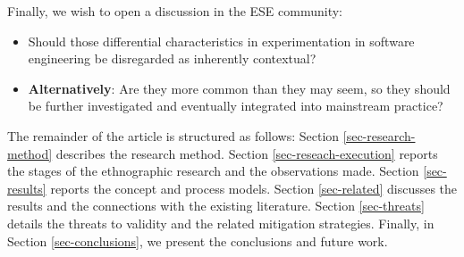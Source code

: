 Finally, we wish to open a discussion in the ESE community: 
\begin{itemize}
  \item Should those differential characteristics in experimentation in software engineering be disregarded as inherently contextual?
  \item  \textbf{Alternatively}: Are they more common than they may seem, so they should be further investigated and eventually integrated into mainstream practice?
\end{itemize}

The remainder of the article is structured as follows: Section \ref{sec-research-method} describes the research method. Section \ref{sec-reseach-execution} reports the stages of the ethnographic research and the observations made. Section \ref{sec-results} reports the concept and process models. Section \ref{sec-related} discusses the results and the connections with the existing literature. Section \ref{sec-threats} details the threats to validity and the related mitigation strategies. Finally, in Section \ref{sec-conclusions}, we present the conclusions and future work.